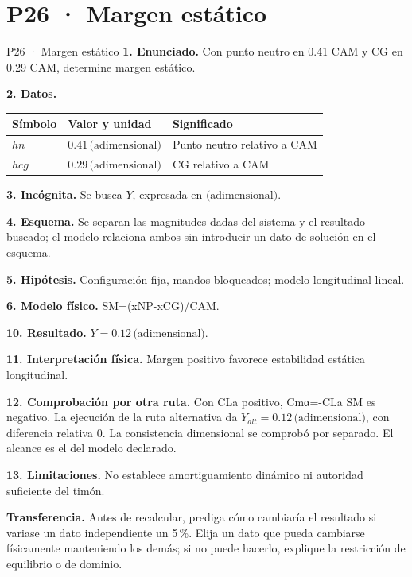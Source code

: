 \chapter*{P26 · Margen estático}
\begin{studiumworked}{P26 · Margen estático}
\textbf{1. Enunciado.} Con punto neutro en 0.41 CAM y CG en 0.29 CAM, determine margen estático.

\textbf{2. Datos.}
\begin{longtable}{p{.16\linewidth}p{.35\linewidth}p{.38\linewidth}}\toprule Símbolo & Valor y unidad & Significado\\\midrule\endhead
$hn$ & $0.41\,\text{(adimensional)}$ & Punto neutro relativo a CAM\\
$hcg$ & $0.29\,\text{(adimensional)}$ & CG relativo a CAM\\
\bottomrule\end{longtable}
\textbf{3. Incógnita.} Se busca $Y$, expresada en $\text{(adimensional)}$.

\textbf{4. Esquema.} Se separan las magnitudes dadas del sistema y el resultado buscado; el modelo relaciona ambos sin introducir un dato de solución en el esquema.

\textbf{5. Hipótesis.} Configuración fija, mandos bloqueados; modelo longitudinal lineal.

\textbf{6. Modelo físico.} SM=(xNP-xCG)/CAM.


\textbf{10. Resultado.} $Y=0.12\,\text{(adimensional)}$.

\textbf{11. Interpretación física.} Margen positivo favorece estabilidad estática longitudinal.

\textbf{12. Comprobación por otra ruta.} Con CLa positivo, Cmα=-CLa SM es negativo. La ejecución de la ruta alternativa da $Y_{alt}=0.12\,\text{(adimensional)}$, con diferencia relativa $0$. La consistencia dimensional se comprobó por separado. El alcance es el del modelo declarado.

\textbf{13. Limitaciones.} No establece amortiguamiento dinámico ni autoridad suficiente del timón.

\textbf{Transferencia.} Antes de recalcular, prediga cómo cambiaría el resultado si variase un dato independiente un 5\,\%. Elija un dato que pueda cambiarse físicamente manteniendo los demás; si no puede hacerlo, explique la restricción de equilibrio o de dominio.\par
\end{studiumworked}
